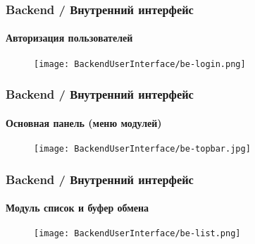 
\begin{frame}[fragile]
	\frametitle{Backend / Внутренний интерфейс}
	\framesubtitle{Авторизация пользователей}

	\begin{figure}
		\texttt{[image: BackendUserInterface/be-login.png]}
	\end{figure}

\end{frame}


\begin{frame}[fragile]
	\frametitle{Backend / Внутренний интерфейс}
	\framesubtitle{Основная панель (меню модулей)}

	\begin{figure}
		\texttt{[image: BackendUserInterface/be-topbar.jpg]}
	\end{figure}

\end{frame}


\begin{frame}[fragile]
	\frametitle{Backend / Внутренний интерфейс}
	\framesubtitle{Модуль список и буфер обмена}

	\begin{figure}
		\texttt{[image: BackendUserInterface/be-list.png]}
	\end{figure}

\end{frame}

